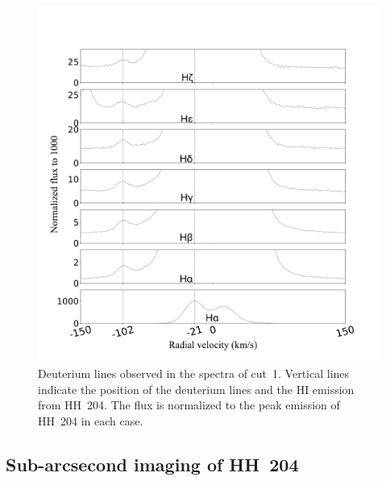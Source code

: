\documentclass[twocolumn,linenumbers]{aastex63}
\begin{document}
\begin{figure}
\centering
\includegraphics[width=\columnwidth]{deuterium.pdf}
\caption{Deuterium lines observed in the spectra of cut~1. Vertical lines indicate the position of the deuterium lines and the H\thinspace I emission from HH~204. The flux is normalized to the peak emission of HH~204 in each case. }
\label{fig:deute}
\end{figure}



\subsection{Sub-arcsecond imaging of HH~204}
\label{sec:high-resol-imag}
\end{document}
